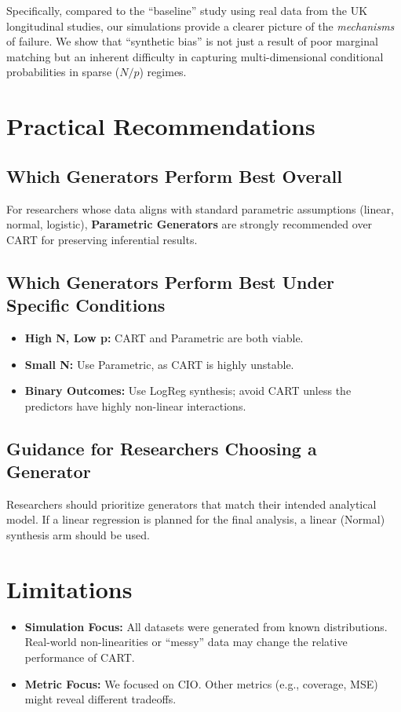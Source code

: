 Specifically, compared to the ``baseline'' study using real data from the UK longitudinal studies, our simulations provide a clearer picture of the \emph{mechanisms} of failure. We show that ``synthetic bias'' is not just a result of poor marginal matching but an inherent difficulty in capturing multi-dimensional conditional probabilities in sparse ($N/p$) regimes.

\section{Practical Recommendations}
\label{sec:reg-recommendations}

\subsection{Which Generators Perform Best Overall}
For researchers whose data aligns with standard parametric assumptions (linear, normal, logistic), \textbf{Parametric Generators} are strongly recommended over CART for preserving inferential results.

\subsection{Which Generators Perform Best Under Specific Conditions}
\begin{itemize}
    \item \textbf{High N, Low p:} CART and Parametric are both viable.
    \item \textbf{Small N:} Use Parametric, as CART is highly unstable.
    \item \textbf{Binary Outcomes:} Use LogReg synthesis; avoid CART unless the predictors have highly non-linear interactions.
\end{itemize}

\subsection{Guidance for Researchers Choosing a Generator}
Researchers should prioritize generators that match their intended analytical model. If a linear regression is planned for the final analysis, a linear (Normal) synthesis arm should be used.

\section{Limitations}
\label{sec:reg-limitations}
\begin{itemize}
    \item \textbf{Simulation Focus:} All datasets were generated from known distributions. Real-world non-linearities or ``messy'' data may change the relative performance of CART.
    \item \textbf{Metric Focus:} We focused on CIO. Other metrics (e.g., coverage, MSE) might reveal different tradeoffs.
\end{itemize}

